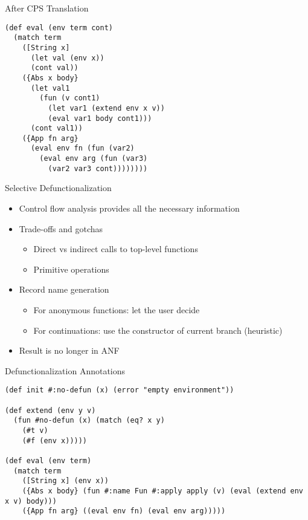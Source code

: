 \documentclass[handout]{beamer}
\begin{document}
\begin{frame}[fragile]{After CPS Translation}
  \begin{lstlisting}
(def eval (env term cont)
  (match term
    ([String x]
      (let val (env x))
      (cont val))
    ({Abs x body}
      (let val1
        (fun (v cont1)
          (let var1 (extend env x v))
          (eval var1 body cont1)))
      (cont val1))
    ({App fn arg}
      (eval env fn (fun (var2)
        (eval env arg (fun (var3)
          (var2 var3 cont))))))))
  \end{lstlisting}
\end{frame}

\begin{frame}[fragile]{Selective Defunctionalization}
  \begin{itemize}
    \item Control flow analysis provides all the necessary information\pause
    \item Trade-offs and gotchas \pause
    \begin{itemize}
      \item Direct vs indirect calls to top-level functions\pause
      \item Primitive operations\pause
    \end{itemize}
    \item Record name generation \pause
    \begin{itemize}
      \item For anonymous functions: let the user decide\pause
      \item For continuations: use the constructor of current branch (heuristic)\pause
    \end{itemize}
    \item Result is no longer in ANF
  \end{itemize}
\end{frame}

\begin{frame}[fragile]{Defunctionalization Annotations}
  \begin{lstlisting}
(def init #:no-defun (x) (error "empty environment"))

(def extend (env y v)
  (fun #no-defun (x) (match (eq? x y)
    (#t v)
    (#f (env x)))))

(def eval (env term)
  (match term
    ([String x] (env x))
    ({Abs x body} (fun #:name Fun #:apply apply (v) (eval (extend env x v) body)))
    ({App fn arg} ((eval env fn) (eval env arg)))))
  \end{lstlisting}
\end{frame}
\end{document}
